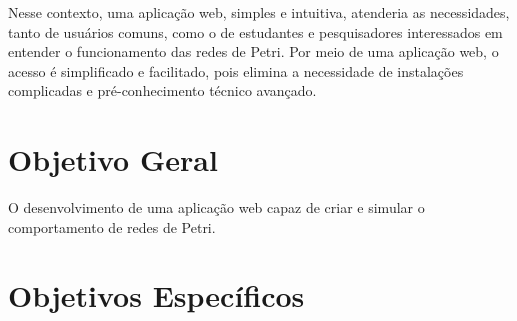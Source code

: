 \documentclass[
	12pt,				%
	openright,			%
	oneside,			%
	a4paper,			%
	english,			%
	brazil				%
	]{abntex2}
\theoremstyle{doispontos}
\begin{document}
Nesse contexto, uma aplicação web, simples e intuitiva, atenderia as necessidades, tanto de usuários comuns, como o de estudantes e pesquisadores interessados em entender o funcionamento das redes de Petri. Por meio de uma aplicação web, o acesso é simplificado e facilitado, pois elimina a necessidade de instalações complicadas e pré-conhecimento técnico avançado.








\section{Objetivo Geral}

O desenvolvimento de uma aplicação web capaz de criar e simular o comportamento de redes de Petri.

\section{Objetivos Específicos} \label{cap:objEspecifico}
\end{document}
